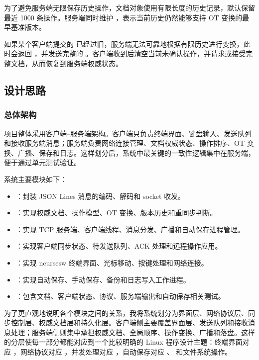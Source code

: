 为了避免服务端无限保存历史操作，文档对象使用有限长度的历史记录，默认保留最近 1000 条操作。服务端同时维护 ，表示当前历史仍然能够支持 OT 变换的最早基准版本。

如果某个客户端提交的  已经过旧，服务端无法可靠地根据有限历史进行变换，此时会返回 ，并发送完整的 。客户端收到后清空当前未确认操作，并请求或接受完整文档，从而恢复到服务端权威状态。

\newpage
\subsection{设计思路}

\subsubsection{总体架构}

项目整体采用客户端--服务端架构。客户端只负责终端界面、键盘输入、发送队列和接收服务端消息；服务端负责网络连接管理、文档权威状态、操作排序、OT 变换、广播、保存和日志。这样划分后，系统中最关键的一致性逻辑集中在服务端，便于通过单元测试验证。

系统主要模块如下：

\begin{itemize}
  \item {}：封装 JSON Lines 消息的编码、解码和 socket 收发。
  \item {}：实现权威文档、操作模型、OT 变换、版本历史和重同步判断。
  \item {}：实现 TCP 服务端、客户端线程、消息分发、广播和自动保存进程管理。
  \item {}：实现客户端同步状态、待发送队列、ACK 处理和远程操作应用。
  \item {}：实现 ncursesw 终端界面、光标移动、按键处理和网络连接。
  \item {}：实现自动保存、手动保存、备份和日志写入工作进程。
  \item {}：包含文档、客户端状态、协议、服务端输出和自动保存相关测试。
\end{itemize}

为了更直观地说明各个模块之间的关系，我将系统划分为界面层、网络协议层、同步控制层、权威文档层和持久化层。客户端侧主要覆盖界面层、发送队列和接收消息处理；服务端侧则集中承担权威文档、全局顺序、操作变换、广播和落盘。这样的分层使每一部分都能对应到一个比较明确的 Linux 程序设计主题：终端界面对应 ，网络协议对应 ，并发处理对应 ，自动保存对应 、 和文件系统操作。

